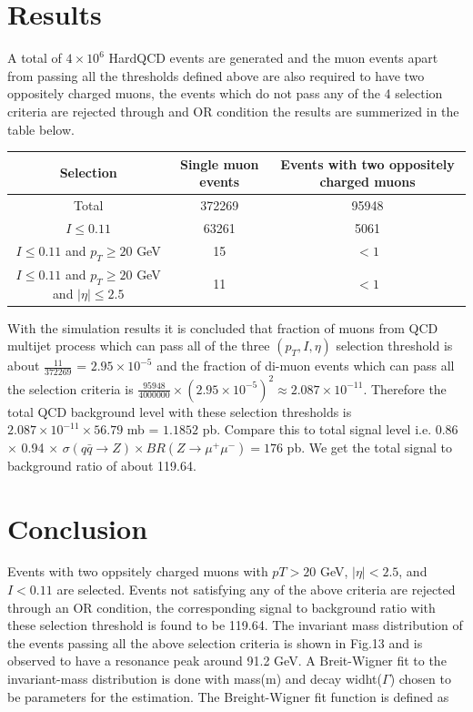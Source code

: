 \documentclass{article}		%
\begin{document}
\section{Results}

A total of $4 \times 10^6$ HardQCD events are generated and the muon events apart from passing all the thresholds defined above are also required to have two oppositely charged muons, the events which do not pass any of the 4 selection criteria are rejected through and OR condition the results are summerized in the table below. 

\begin{center}
	\begin{tabular}{|c|c|c|}
		\hline
		Selection & Single muon events & Events with two oppositely charged muons\\
		\hline
		Total & 372269 & 95948\\
		\hline
	     $I \le 0.11$ & 63261 & 5061\\
		\hline  
		$I \le 0.11$ and $p_T \ge 20$ GeV & 15 & $<1$\\
		\hline
		$I \le 0.11$ and $p_T \ge 20$ GeV and $|\eta| \le 2.5$ & 11 & $<1$\\
		\hline
	\end{tabular}
\end{center}

	With the simulation results it is concluded that fraction of muons from QCD multijet process which can pass all of the three $(p_T,I,\eta)$ selection threshold is about $\frac{11}{372269}$ = $2.95 \times 10^{-5}$ and the fraction of di-muon events which can pass all the selection criteria is $\frac{95948}{4000000} \times \left(2.95 \times 10^{-5} \right)^2 \approx 2.087 \times 10^{-11} $. Therefore the total QCD background level with these selection thresholds is $ 2.087 \times 10^{-11} \times 56.79$ mb = $ 1.1852$ pb. Compare this to total signal level i.e. 0.86 $\times$ 0.94 $\times$ $\sigma(q\bar{q} \to Z) \times BR(Z \to \mu^+\mu^-) = 176$ pb. We get the total signal to background ratio of about 119.64.     		

	

\section{Conclusion}

Events with two oppsitely charged muons with $pT>20 $ GeV, $|\eta|<2.5$, and $I<0.11$ are selected. Events not satisfying any of the above criteria are rejected through an OR condition, the corresponding signal to background ratio with these selection threshold is found to be 119.64. The invariant mass distribution of the events passing all the above selection criteria is shown in Fig.13 and is observed to have a resonance peak around 91.2 GeV.
A Breit-Wigner fit to the invariant-mass distribution is done with mass(m) and decay widht($\Gamma$) chosen to be parameters for the estimation. The Breight-Wigner fit function is defined as 
\end{document}
